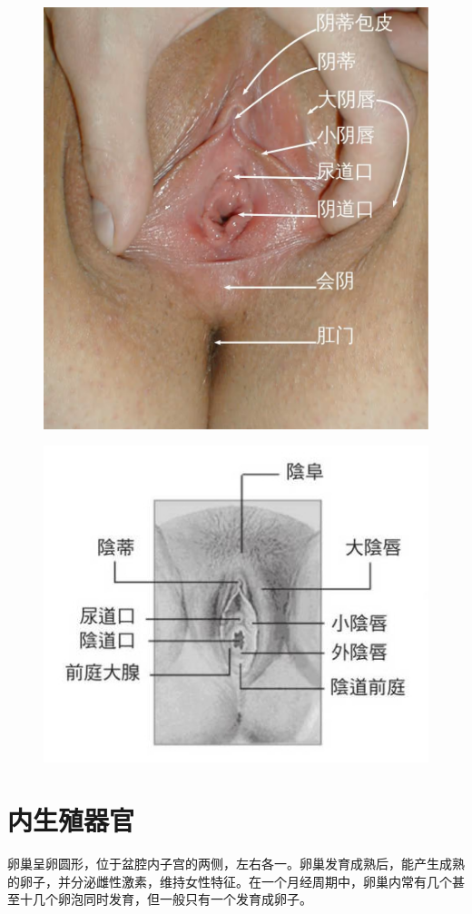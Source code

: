 \documentclass[12pt,UTF8]{ctexbook}
\begin{document}
\begin{figure}[htbp]
	\centering
	\includegraphics[width=0.7\linewidth]{1}
	\caption{}
	\label{fig:1}
\end{figure}

\begin{figure}[htbp]
	\centering
	\includegraphics[width=0.7\linewidth]{2}
	\caption{}
	\label{fig:1}
\end{figure}

\section{内生殖器官}

卵巢呈卵圆形，位于盆腔内子宫的两侧，左右各一。卵巢发育成熟后，能产生成熟的卵子，并分泌雌性激素，维持女性特征。在一个月经周期中，卵巢内常有几个甚至十几个卵泡同时发育，但一般只有一个发育成卵子。
\end{document}
